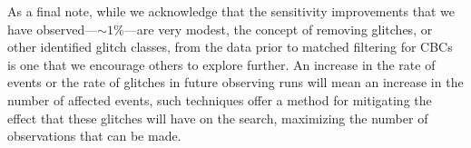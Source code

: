 As a final note, while we acknowledge that the sensitivity improvements that we have observed---${\sim} 1\%$---are very modest, the concept of removing \scladj glitches, or other identified glitch classes, from the data prior to matched filtering for CBCs is one that we encourage others to explore further. An increase in the rate of events or the rate of \scladj glitches in future observing runs will mean an increase in the number of affected events, such techniques offer a method for mitigating the effect that these glitches will have on the search, maximizing the number of observations that can be made.
